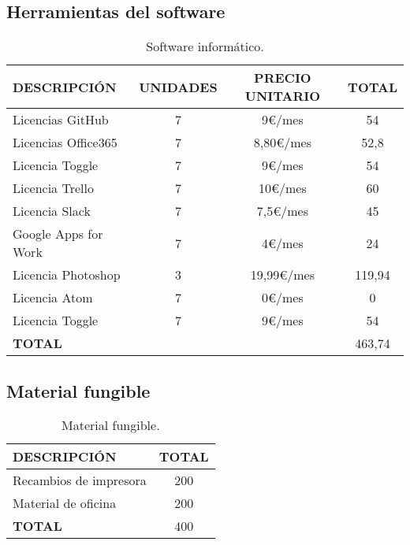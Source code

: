 \documentclass[10pt,a4paper,oldfontcommands]{plantillaDPDS}
\begin{document}
\subsection{Herramientas del software}
\begin{table}[H]
\begin{center}
\begin{tabular}{l c c c}
\textbf{DESCRIPCIÓN} & \textbf{UNIDADES} & \textbf{PRECIO UNITARIO} & \textbf{TOTAL}\\ \hline \hline
Licencias GitHub & 7 & 9\euro/mes & 54\\
Licencias Office365 & 7 & 8,80\euro/mes & 52,8\\
Licencia Toggle & 7 & 9\euro/mes & 54\\
Licencia Trello & 7 & 10\euro/mes & 60\\
Licencia Slack & 7 & 7,5\euro/mes & 45\\
Google Apps for Work & 7 & 4\euro/mes & 24\\
Licencia Photoshop & 3 & 19,99\euro/mes & 119,94\\
Licencia Atom & 7 & 0\euro/mes & 0\\
Licencia Toggle & 7 & 9\euro/mes & 54\\ \hline \hline
\textbf{TOTAL} & & & 463,74\\ \hline
\end{tabular}
\caption{Software informático.}
\label{tab:software}
\end{center}
\end{table}



\subsection{Material fungible}
\begin{table}[H]
\begin{center}
\begin{tabular}{l c}
\textbf{DESCRIPCIÓN} & \textbf{TOTAL}\\ \hline \hline
Recambios de impresora & 200\\
Material de oficina & 200\\ \hline \hline
\textbf{TOTAL} & 400\\ \hline
\end{tabular}
\caption{Material fungible.}
\label{tab:fungible}
\end{center}
\end{table}
\end{document}
